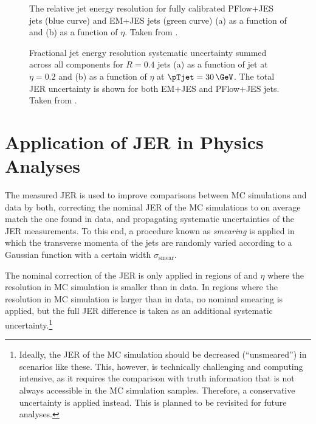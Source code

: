 \begin{figure}
    \caption{The relative jet energy resolution for fully calibrated PFlow+JES jets (blue curve) and EM+JES jets (green curve) (a) as a function of \pTjet and (b) as a function of $\eta$. Taken from .}
    \label{fig:jer-combination-results}
\end{figure}



\FloatBarrier
\begin{figure}[t]
    \caption{Fractional jet energy resolution systematic uncertainty summed across all components for \antikt $R = 0.4$ jets (a) as a function of jet \pTjet at $\eta = 0.2$ and (b) as a function of $\eta$ at $\pTjet = 30\,\GeV$. The total JER uncertainty is shown for both EM+JES and PFlow+JES jets. Taken from .}
    \label{fig:jer-combination-uncertainties}
\end{figure}



\section{Application of JER in Physics Analyses}
The measured JER is used to improve comparisons between MC simulations and data by both, correcting the nominal JER of the MC simulations to on average match the one found in data, and propagating systematic uncertainties of the JER measurements.
To this end, a procedure known as \emph{smearing} is applied in which the transverse momenta of the jets are randomly varied according to a Gaussian function with a certain width $\sigma_{\text{smear}}$.

The nominal correction of the JER is only applied in regions of \pT and $\eta$ where the resolution in MC simulation is smaller than in data. In regions where the resolution in MC simulation is larger than in data, no nominal smearing is applied, but the full JER difference is taken as an additional systematic uncertainty.\footnote{Ideally, the JER of the MC simulation should be decreased (``unsmeared'') in scenarios like these. This, however, is technically challenging and computing intensive, as it requires the comparison with truth information that is not always accessible in the MC simulation samples. Therefore, a conservative uncertainty is applied instead. This is planned to be revisited for future analyses.}

